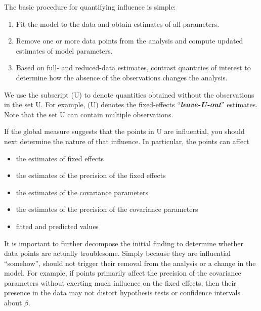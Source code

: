 \documentclass[Main.tex]{subfiles}
\begin{document}
		
		The basic procedure for quantifying influence is simple:
		
		\begin{enumerate}
			\item Fit the model to the data and obtain estimates of all parameters.
			\item Remove one or more data points from the analysis and compute updated estimates of model parameters.
			\item Based on full- and reduced-data estimates, contrast quantities of interest to determine how the absence
			of the observations changes the analysis.
		\end{enumerate}
		We use the subscript (U) to denote quantities obtained without the observations in the set U. For example,
		(U) denotes the fixed-effects “\textit{\textbf{leave-U-out}}” estimates. Note that the set U can contain multiple observations.
		
		
		If the global measure suggests that the points in U are influential, you should next determine the nature of
		that influence. In particular, the points can affect
		\begin{itemize}
			\item the estimates of fixed effects
			\item the estimates of the precision of the fixed effects
			\item the estimates of the covariance parameters
			\item the estimates of the precision of the covariance parameters
			\item fitted and predicted values
		\end{itemize}
		
		It is important to further decompose the initial finding to determine whether data points are actually troublesome.
		Simply because they are influential “somehow”, should not trigger their removal from the analysis or
		a change in the model. For example, if points primarily affect the precision of the covariance parameters
		without exerting much influence on the fixed effects, then their presence in the data may not distort hypothesis
		tests or confidence intervals about $\beta$.
\end{document}
